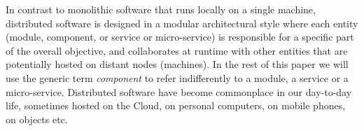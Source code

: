 %


In contrast to monolithic software that runs locally on a single machine, distributed software is designed in a modular architectural style where each entity (\ie module, component, or service or micro-service) is responsible for a specific part of the overall objective, and collaborates at runtime with other entities that are potentially hosted on distant nodes (\ie machines). In the rest of this paper we will use the generic term \emph{component} to refer indifferently to a module, a service or a micro-service. Distributed software have become commonplace in our day-to-day life, sometimes hosted on the Cloud, on personal computers, on mobile phones, on objects etc. 

